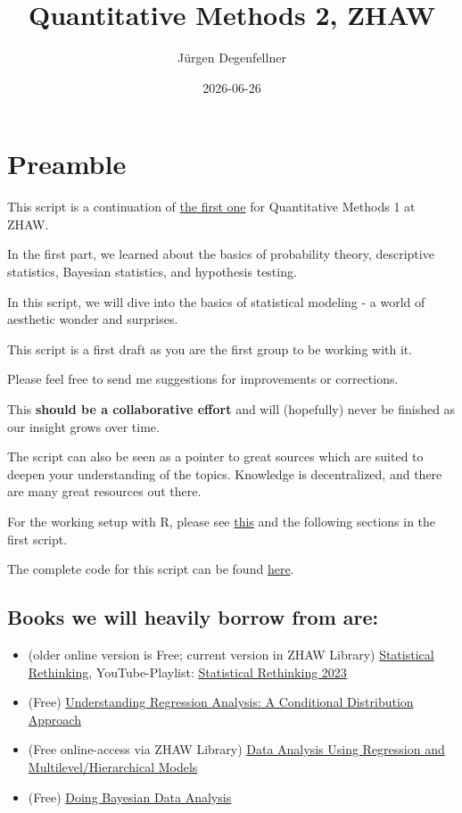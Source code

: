 \documentclass[
]{book}
\title{Quantitative Methods 2, ZHAW}
\author{Jürgen Degenfellner}
\date{2026-06-26}
\providecommand{\tightlist}{%
  \setlength{\itemsep}{0pt}\setlength{\parskip}{0pt}}
\begin{document}
\maketitle

{
\setcounter{tocdepth}{1}
\tableofcontents
}
\chapter{Preamble}\label{intro0}

This script is a continuation of
\href{https://jdegenfellner.github.io/Script_QM1_ZHAW/}{the first one} for Quantitative Methods 1
at ZHAW.

In the first part, we learned about the basics of probability theory,
descriptive statistics, Bayesian statistics, and hypothesis testing.

In this script, we will dive into the basics of statistical modeling -
a world of aesthetic wonder and surprises.

This script is a first draft as you are the first group to be working with it.

Please feel free to send me suggestions for improvements or corrections.

This \textbf{should be a collaborative effort} and will (hopefully)
never be finished as our insight grows over time.

The script can also be seen as a pointer to great sources which are
suited to deepen your understanding of the topics. Knowledge is decentralized,
and there are many great resources out there.

For the working setup with R, please
see \href{https://jdegenfellner.github.io/Script_QM1_ZHAW/index.html\#section}{this}
and the following sections in the first script.

The complete code for this script can be found
\href{https://github.com/jdegenfellner/Script_QM2_ZHAW}{here}.

\section{Books we will heavily borrow from are:}\label{books-we-will-heavily-borrow-from-are}

\begin{itemize}
\tightlist
\item
  (older online version is Free; current version in ZHAW Library) \href{https://civil.colorado.edu/~balajir/CVEN6833/bayes-resources/RM-StatRethink-Bayes.pdf}{Statistical Rethinking}, YouTube-Playlist: \href{https://youtu.be/FdnMWdICdRs?si=q2py5QVY_L299hEa}{Statistical Rethinking 2023}
\item
  (Free) \href{https://vdoc.pub/documents/understanding-regression-analysis-a-conditional-distribution-approach-84oqjr8sqva0}{Understanding Regression Analysis: A Conditional Distribution Approach}
\item
  (Free online-access via ZHAW Library) \href{http://www.stat.columbia.edu/~gelman/arm/}{Data Analysis Using Regression and Multilevel/Hierarchical Models}
\item
  (Free) \href{https://nyu-cdsc.github.io/learningr/assets/kruschke_bayesian_in_R.pdf}{Doing Bayesian Data Analysis}
\end{itemize}
\end{document}

